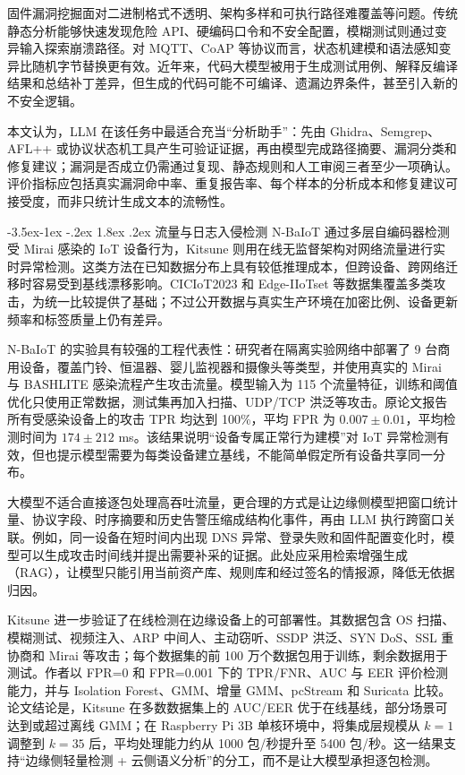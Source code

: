 \documentclass[twoside,withoutpreface,bwprint]{cumcmthesis}
\makeatletter
\renewcommand\subsection{\@startsection{subsection}{2}{\z@}%
    {-3.5ex\@plus -1ex \@minus -.2ex}%
    {1.8ex \@plus .2ex}%
    {\normalfont\heiti\zihao{-4}}}
\makeatother
\begin{document}
固件漏洞挖掘面对二进制格式不透明、架构多样和可执行路径难覆盖等问题。传统静态分析能够快速发现危险 API、硬编码口令和不安全配置，模糊测试则通过变异输入探索崩溃路径。对 MQTT、CoAP 等协议而言，状态机建模和语法感知变异比随机字节替换更有效。近年来，代码大模型被用于生成测试用例、解释反编译结果和总结补丁差异，但生成的代码可能不可编译、遗漏边界条件，甚至引入新的不安全逻辑。

本文认为，LLM 在该任务中最适合充当“分析助手”：先由 Ghidra、Semgrep、AFL++ 或协议状态机工具产生可验证证据，再由模型完成路径摘要、漏洞分类和修复建议；漏洞是否成立仍需通过复现、静态规则和人工审阅三者至少一项确认。评价指标应包括真实漏洞命中率、重复报告率、每个样本的分析成本和修复建议可接受度，而非只统计生成文本的流畅性。

\subsection{流量与日志入侵检测}
N-BaIoT 通过多层自编码器检测受 Mirai 感染的 IoT 设备行为\cite{meidan2018nbaiot}，Kitsune 则用在线无监督架构对网络流量进行实时异常检测\cite{mirsky2018kitsune}。这类方法在已知数据分布上具有较低推理成本，但跨设备、跨网络迁移时容易受到基线漂移影响。CICIoT2023 和 Edge-IIoTset 等数据集覆盖多类攻击，为统一比较提供了基础\cite{ciciot2023,edgeiiotset}；不过公开数据与真实生产环境在加密比例、设备更新频率和标签质量上仍有差异。

N-BaIoT 的实验具有较强的工程代表性：研究者在隔离实验网络中部署了 9 台商用设备，覆盖门铃、恒温器、婴儿监视器和摄像头等类型，并使用真实的 Mirai 与 BASHLITE 感染流程产生攻击流量。模型输入为 115 个流量特征，训练和阈值优化只使用正常数据，测试集再加入扫描、UDP/TCP 洪泛等攻击。原论文报告所有受感染设备上的攻击 TPR 均达到 100\%，平均 FPR 为 $0.007\pm0.01$，平均检测时间为 $174\pm212$ ms\cite{meidan2018nbaiot}。该结果说明“设备专属正常行为建模”对 IoT 异常检测有效，但也提示模型需要为每类设备建立基线，不能简单假定所有设备共享同一分布。

大模型不适合直接逐包处理高吞吐流量，更合理的方式是让边缘侧模型把窗口统计量、协议字段、时序摘要和历史告警压缩成结构化事件，再由 LLM 执行跨窗口关联。例如，同一设备在短时间内出现 DNS 异常、登录失败和固件配置变化时，模型可以生成攻击时间线并提出需要补采的证据。此处应采用检索增强生成（RAG）\cite{lewis2020rag}，让模型只能引用当前资产库、规则库和经过签名的情报源，降低无依据归因。

Kitsune 进一步验证了在线检测在边缘设备上的可部署性。其数据包含 OS 扫描、模糊测试、视频注入、ARP 中间人、主动窃听、SSDP 洪泛、SYN DoS、SSL 重协商和 Mirai 等攻击；每个数据集的前 100 万个数据包用于训练，剩余数据用于测试。作者以 FPR=0 和 FPR=0.001 下的 TPR/FNR、AUC 与 EER 评价检测能力，并与 Isolation Forest、GMM、增量 GMM、pcStream 和 Suricata 比较。论文结论是，Kitsune 在多数数据集上的 AUC/EER 优于在线基线，部分场景可达到或超过离线 GMM；在 Raspberry Pi 3B 单核环境中，将集成层规模从 $k=1$ 调整到 $k=35$ 后，平均处理能力约从 1000 包/秒提升至 5400 包/秒\cite{mirsky2018kitsune}。这一结果支持“边缘侧轻量检测 + 云侧语义分析”的分工，而不是让大模型承担逐包检测。
\end{document}

